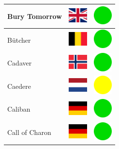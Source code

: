\documentclass[12pt, a4paper, twoside]{report}
\begin{document}
\begin{center}
\begin{longtable}{|p{5cm}|p{2cm}|p{2cm}|}
 Bury Tomorrow                                              & \includegraphics[width=1cm]{../img/flags/gb} &   \includegraphics[width=1cm]{../likes/y} \\ \hline
 Bütcher                                                    & \includegraphics[width=1cm]{../img/flags/be} &   \includegraphics[width=1cm]{../likes/y} \\ \hline
 Cadaver                                                    & \includegraphics[width=1cm]{../img/flags/no} &   \includegraphics[width=1cm]{../likes/y} \\ \hline
 Caedere                                                    & \includegraphics[width=1cm]{../img/flags/nl} &   \includegraphics[width=1cm]{../likes/m} \\ \hline
 Caliban                                                    & \includegraphics[width=1cm]{../img/flags/de} &   \includegraphics[width=1cm]{../likes/y} \\ \hline
 Call of Charon                                             & \includegraphics[width=1cm]{../img/flags/de} &   \includegraphics[width=1cm]{../likes/y} \\ \hline

\end{longtable}
\end{center}
\end{document}
